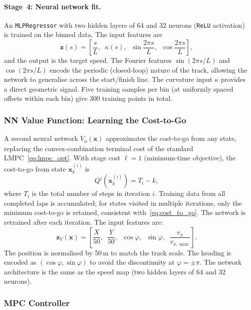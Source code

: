 \paragraph{Stage~4: Neural network fit.} An \texttt{MLPRegressor} with two hidden layers of 64 and 32 neurons (\texttt{ReLU} activation) is trained on the binned data. The input features are
\begin{equation*}
	\mathbf{z}(s) = \left[\frac{s}{L},\;\; \kappa(s),\;\; \sin\!\frac{2\pi s}{L},\;\; \cos\!\frac{2\pi s}{L}\right],
\end{equation*}
and the output is the target speed. The Fourier features $\sin(2\pi s/L)$ and $\cos(2\pi s/L)$ encode the periodic (closed-loop) nature of the track, allowing the network to generalise across the start/finish line. The curvature input $\kappa$ provides a direct geometric signal. Five training samples per bin (at uniformly spaced offsets within each bin) give 300 training points in total.


\subsubsection{NN Value Function: Learning the Cost-to-Go}

A second neural network $V_\phi(\mathbf{x})$ approximates the cost-to-go from any state, replacing the convex-combination terminal cost of the standard LMPC~\eqref{eq:lmpc_opt}. With stage cost $\ell = 1$ (minimum-time objective), the cost-to-go from state $\mathbf{x}_k^{(i)}$ is
\begin{equation*}
	Q^j(\mathbf{x}_k^{(i)}) = T_i - k,
\end{equation*}
where $T_i$ is the total number of steps in iteration $i$. Training data from all completed laps is accumulated; for states visited in multiple iterations, only the minimum cost-to-go is retained, consistent with~\eqref{eq:cost_to_go}. The network is retrained after each iteration. The input features are:
\begin{equation*}
	\mathbf{z}_V(\mathbf{x}) = \left[\frac{X}{50},\;\; \frac{Y}{50},\;\; \cos\varphi,\;\; \sin\varphi,\;\; \frac{v_x}{v_{x,\max}}\right].
\end{equation*}
The position is normalised by 50\,m to match the track scale. The heading is encoded as $(\cos\varphi, \sin\varphi)$ to avoid the discontinuity at $\varphi = \pm\pi$. The network architecture is the same as the speed map (two hidden layers of 64 and 32 neurons).


\subsubsection{MPC Controller}
\label{sec:racing_mpc}

